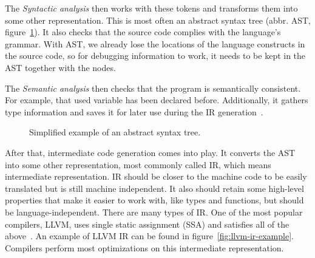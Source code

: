 The \textit{Syntactic analysis} then works with these tokens and transforms
them into some other representation. This is most often an abstract syntax tree
(abbr. AST, figure~\ref{fig:ast}). It also checks that the source code complies
with the language's grammar. With AST, we already lose the locations of the
language constructs in the source code, so for debugging information to work,
it needs to be kept in the AST together with the nodes.

The \textit{Semantic analysis} then checks that the program is semantically
consistent. For example, that used variable has been declared before.
Additionally, it gathers type information and saves it for later use during the
IR generation~\cite{dragon-book}.

\begin{figure}
    \centering
    \caption{Simplified example of an abstract syntax tree.}
    \label{fig:ast}
\end{figure}
 
After that, intermediate code generation comes into play. It converts the AST
into some other representation, most commonly called IR, which means
intermediate representation. IR should be closer to the machine code to be
easily translated but is still machine independent. It also should retain some
high-level properties that make it easier to work with, like types and
functions, but should be language-independent. There are many types of IR. One
of the most popular compilers, LLVM, uses single static assignment (SSA) and
satisfies all of the above~\cite{llvm}. An example of LLVM IR can be found in
figure~\ref{fig:llvm-ir-example}. Compilers perform most optimizations on this
intermediate representation. 

